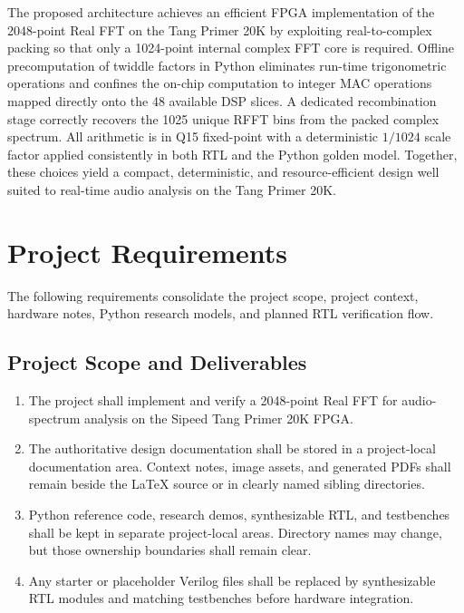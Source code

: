 \documentclass[12pt, a4paper]{article}
\begin{document}
The proposed architecture achieves an efficient FPGA implementation of the
2048-point Real FFT on the Tang Primer 20K by exploiting real-to-complex
packing so that only a 1024-point internal complex FFT core is required.
Offline precomputation of twiddle factors in Python eliminates run-time
trigonometric operations and confines the on-chip computation to integer
MAC operations mapped directly onto the 48 available DSP slices.
A dedicated recombination stage correctly recovers the 1025 unique RFFT bins
from the packed complex spectrum.
All arithmetic is in Q15 fixed-point with a deterministic $1/1024$ scale
factor applied consistently in both RTL and the Python golden model.
Together, these choices yield a compact, deterministic, and resource-efficient
design well suited to real-time audio analysis on the Tang Primer 20K.

\section{Project Requirements}

The following requirements consolidate the project scope, project context,
hardware notes, Python research models, and planned RTL verification flow.

\subsection{Project Scope and Deliverables}

\begin{enumerate}[leftmargin=*, label=\textbf{PRJ-\arabic*:}]
    \item The project shall implement and verify a 2048-point Real FFT for
          audio-spectrum analysis on the Sipeed Tang Primer 20K FPGA.
    \item The authoritative design documentation shall be stored in a
          project-local documentation area. Context notes, image assets, and
          generated PDFs shall remain beside the LaTeX source or in clearly
          named sibling directories.
    \item Python reference code, research demos, synthesizable RTL, and
          testbenches shall be kept in separate project-local areas. Directory
          names may change, but those ownership boundaries shall remain clear.
    \item Any starter or placeholder Verilog files shall be replaced by
          synthesizable RTL modules and matching testbenches before hardware
          integration.
\end{enumerate}
\end{document}
